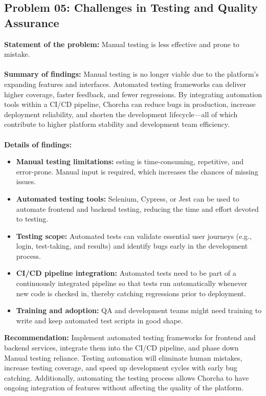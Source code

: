 \documentclass[12pt,a4paper,oneside]{book}
\begin{document}
\subsection{Problem 05: Challenges in Testing and Quality Assurance}
\textbf{Statement of the problem:} Manual testing is less effective and prone to mistake.\\ \\
\textbf{Summary of findings:} Manual testing is no longer viable due to the platform's expanding features and interfaces. Automated testing frameworks can deliver higher coverage, faster feedback, and fewer regressions. By integrating automation tools within a CI/CD pipeline, Chorcha can reduce bugs in production, increase deployment reliability, and shorten the development lifecycle—all of which contribute to higher platform stability and development team efficiency.
\\ \\
\textbf{Details of findings:}
\begin{itemize}
    \item \textbf{Manual testing limitations:} esting is time-consuming, repetitive, and error-prone. Manual input is required, which increases the chances of missing issues.
    \item \textbf{Automated testing tools:} Selenium, Cypress, or Jest can be used to automate frontend and backend testing, reducing the time and effort devoted to testing.
    \item \textbf{Testing scope:} Automated tests can validate essential user journeys (e.g., login, test-taking, and results) and identify bugs early in the development process.
    \item \textbf{CI/CD pipeline integration:} Automated tests need to be part of a continuously integrated pipeline so that tests run automatically whenever new code is checked in, thereby catching regressions prior to deployment.
    \item \textbf{Training and adoption:} QA and development teams might need training to write and keep automated test scripts in good shape.
\end{itemize}
\textbf{Recommendation:} Implement automated testing frameworks for frontend
and backend services, integrate them into the CI/CD pipeline, and phase
down Manual testing reliance. Testing automation will eliminate human mistakes, increase testing coverage, and speed up development cycles with early bug catching. Additionally, automating the testing process allows Chorcha to have ongoing integration of features without affecting the quality of the platform.
\end{document}
